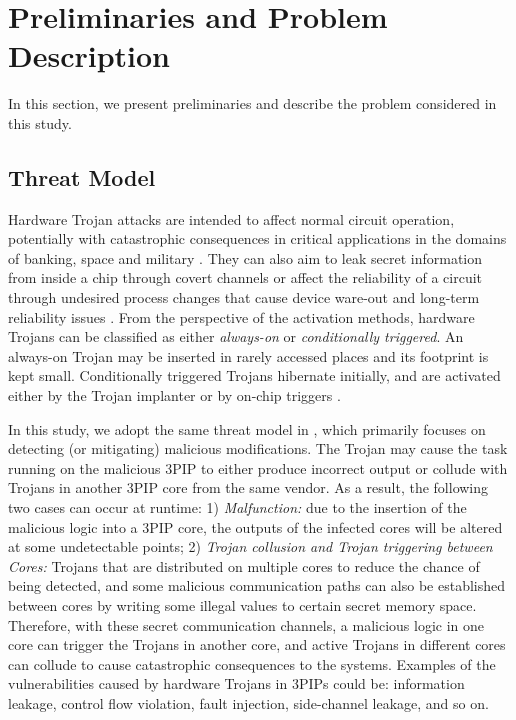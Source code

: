 \documentclass[10pt,journal, compsoc]{IEEEtran}
\begin{document}
\section{Preliminaries and Problem Description}

In this section, we present preliminaries and describe the problem considered in this study.


\subsection{Threat Model}



Hardware Trojan attacks are intended to affect normal circuit operation, potentially with catastrophic consequences in critical applications in the domains of banking, space and military \cite{article:SB1}. They can also aim to leak secret information from inside a chip through covert channels or affect the reliability of a circuit through undesired process changes that cause device ware-out and long-term reliability issues \cite{article:RC}. From the perspective of the activation methods, hardware Trojans can be classified as either \textit{always-on} or \textit{conditionally triggered}. An always-on Trojan may be inserted in rarely accessed places and its footprint is kept small. Conditionally triggered Trojans hibernate initially, and are activated either by the Trojan implanter or by on-chip triggers \cite{article:CL}.

In this study, we adopt the same threat model in \cite{article:CL, article:YS}, which primarily focuses on detecting (or mitigating) malicious modifications. The Trojan may cause the task running on the malicious 3PIP to either produce incorrect output or collude with Trojans in another 3PIP core from the same vendor. As a result, the following two cases can occur at runtime: 1) \textit{Malfunction:} due to the insertion of the malicious logic into a 3PIP core, the outputs of the infected cores will be altered at some undetectable points; 2) \textit{Trojan collusion and Trojan triggering between Cores:} Trojans that are distributed on multiple cores to reduce the chance of being detected, and some malicious communication paths can also be established between cores by writing some illegal values to certain secret memory space. Therefore, with these secret communication channels, a malicious logic in one core can trigger the Trojans in another core, and active Trojans in different cores can collude to cause catastrophic consequences to the systems. Examples of the vulnerabilities caused by hardware Trojans in 3PIPs could be: information leakage, control flow violation, fault injection, side-channel leakage, and so on.
\end{document}
